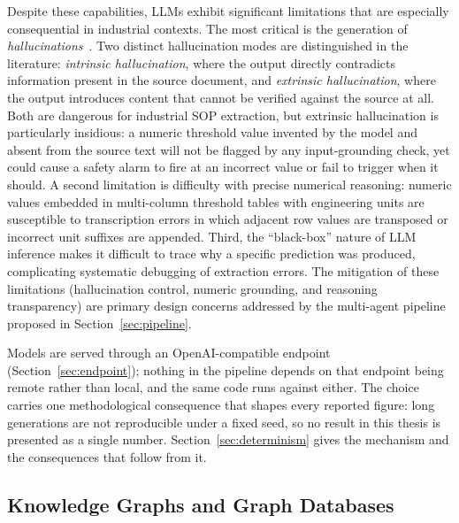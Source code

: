 \documentclass[11pt]{article}
\begin{document}
Despite these capabilities, LLMs exhibit significant limitations that are especially consequential in industrial contexts. The most critical is the generation of \emph{hallucinations}~\cite{ji2023hallucination}. Two distinct hallucination modes are distinguished in the literature: \emph{intrinsic hallucination}, where the output directly contradicts information present in the source document, and \emph{extrinsic hallucination}, where the output introduces content that cannot be verified against the source at all. Both are dangerous for industrial SOP extraction, but extrinsic hallucination is particularly insidious: a numeric threshold value invented by the model and absent from the source text will not be flagged by any input-grounding check, yet could cause a safety alarm to fire at an incorrect value or fail to trigger when it should. A second limitation is difficulty with precise numerical reasoning: numeric values embedded in multi-column threshold tables with engineering units are susceptible to transcription errors in which adjacent row values are transposed or incorrect unit suffixes are appended. Third, the ``black-box'' nature of LLM inference makes it difficult to trace why a specific prediction was produced, complicating systematic debugging of extraction errors. The mitigation of these limitations (hallucination control, numeric grounding, and reasoning transparency) are primary design concerns addressed by the multi-agent pipeline proposed in Section~\ref{sec:pipeline}.

Models are served through an OpenAI-compatible endpoint (Section~\ref{sec:endpoint}); nothing in the pipeline depends on that endpoint being remote rather than local, and the same code runs against either. The choice carries one methodological consequence that shapes every reported figure: long generations are not reproducible under a fixed seed, so no result in this thesis is presented as a single number. Section~\ref{sec:determinism} gives the mechanism and the consequences that follow from it.

\subsection{Knowledge Graphs and Graph Databases}
\label{sec:bg_kg}
\end{document}
